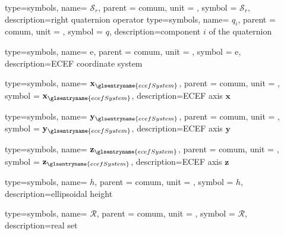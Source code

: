 {type=symbols,
  name= \ensuremath{\boldsymbol{\mathcal{S}}_{r}},
  parent = {comum},
  unit = \unexpanded{},
  symbol = \ensuremath{\boldsymbol{\mathcal{S}}_{r}},
  description={right quaternion operator}
}
{type=symbols,
  name= \ensuremath{q_i},
  parent = {comum},
  unit = {},
  symbol = \ensuremath{q},
  description={component \ensuremath{i} of the quaternion }
}


{type=symbols,
  name= \ensuremath{\mathrm{e}},
  parent = {comum},
  unit = \unexpanded{},
  symbol = \ensuremath{\mathrm{e}},
  description={ECEF coordinate system}
}

{type=symbols,
  name= \ensuremath{\mathbf{x}_{\glsentryname{ecefSystem}}},
  parent = {comum},
  unit = \unexpanded{},
  symbol = \ensuremath{\mathbf{x}_{\glsentryname{ecefSystem}}},
  description={ECEF axis $\mathbf{x}$}
}

{type=symbols,
  name= \ensuremath{\mathbf{y}_{\glsentryname{ecefSystem}}},
  parent = {comum},
  unit = \unexpanded{},
  symbol = \ensuremath{\mathbf{y}_{\glsentryname{ecefSystem}}},
  description={ECEF axis $\mathbf{y}$}
}

{type=symbols,
  name= \ensuremath{\mathbf{z}_{\glsentryname{ecefSystem}}},
  parent = {comum},
  unit = \unexpanded{},
  symbol = \ensuremath{\mathbf{z}_{\glsentryname{ecefSystem}}},
  description={ECEF axis $\mathbf{z}$}
}


{type=symbols,
  name= \ensuremath{h},
  parent = {comum},
  unit = \unexpanded{\si{\meter}},
  symbol = \ensuremath{h},
  description={ellipsoidal height}
}

{type=symbols,
  name= \ensuremath{\mathcal{R}},
  parent = {comum},
  unit = \unexpanded{},
  symbol = \ensuremath{\mathcal{R}},
  description={real set}
}